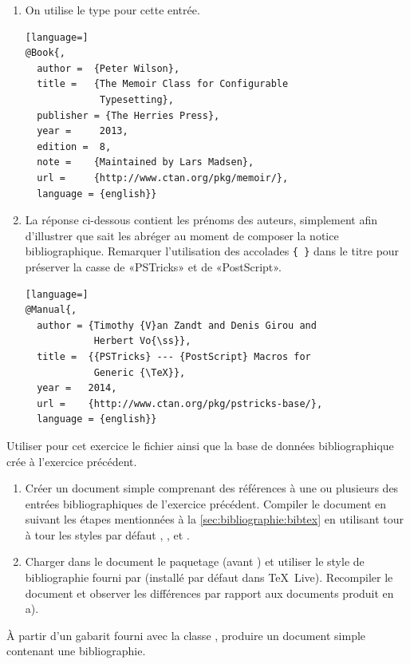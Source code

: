 \begin{exercice}
\begin{sol}
\begin{enumerate}
    \item On utilise le type  pour cette entrée.
\begin{lstlisting}[language=]
@Book{,
  author =  {Peter Wilson},
  title =   {The Memoir Class for Configurable
             Typesetting},
  publisher = {The Herries Press},
  year =     2013,
  edition =  8,
  note =    {Maintained by Lars Madsen},
  url =     {http://www.ctan.org/pkg/memoir/},
  language = {english}}
\end{lstlisting}

    \item La réponse ci-dessous contient les prénoms des auteurs,
      simplement afin d'illustrer que {\BibTeX} sait les abréger au
      moment de composer la notice bibliographique. Remarquer
      l'utilisation des accolades \verb={ }= dans le titre pour
      préserver la casse de «PSTricks» et de «PostScript».
\begin{lstlisting}[language=]
@Manual{,
  author = {Timothy {V}an Zandt and Denis Girou and
            Herbert Vo{\ss}},
  title =  {{PSTricks} --- {PostScript} Macros for
            Generic {\TeX}},
  year =   2014,
  url =    {http://www.ctan.org/pkg/pstricks-base/},
  language = {english}}
\end{lstlisting}
    \end{enumerate}
  \end{sol}
\end{exercice}

\begin{exercice}[nosol]
  Utiliser pour cet exercice le fichier
   ainsi que la base de données
  bibliographique crée à l'exercice précédent.
  \begin{enumerate}
  \item Créer un document simple comprenant des références à une ou
    plusieurs des entrées bibliographiques de l'exercice précédent.
    Compiler le document en suivant les étapes mentionnées à la
    \autoref{sec:bibliographie:bibtex} en utilisant tour à tour les
    styles par défaut , ,  et
    .
  \item Charger dans le document le paquetage  (avant
    ) et utiliser le style de bibliographie 
    fourni par  (installé par défaut dans
    {\TeX}~Live). Recompiler le document et observer les différences
    par rapport aux documents produit en a).
  \end{enumerate}
\end{exercice}

\begin{exercice}[nosol]
  À partir d'un gabarit fourni avec la classe ,
  produire un document simple contenant une bibliographie.
\end{exercice}



